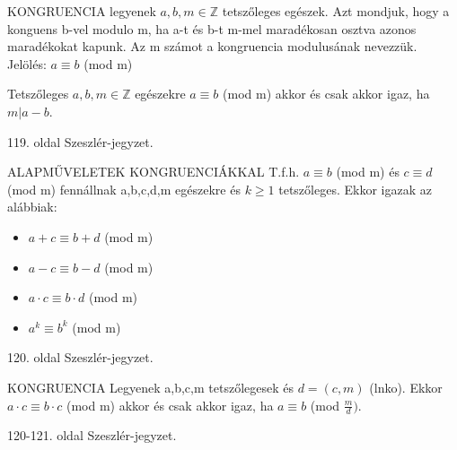 \begin{definicio}{KONGRUENCIA}
legyenek $a,b,m\in\mathbb{Z}$ tetszőleges egészek. Azt mondjuk, hogy a konguens b-vel modulo m, ha a-t és b-t m-mel maradékosan osztva azonos maradékokat kapunk. Az m számot a kongruencia modulusának nevezzük. \\
Jelölés: $a \equiv b$ (mod m)

\end{definicio}

\begin{tetel}{}
Tetszőleges $a,b,m\in\mathbb{Z}$ egészekre $a \equiv b$ (mod m) akkor és csak akkor igaz, ha $m|a-b$.
\end{tetel}

\begin{bizonyitas}{}
119. oldal Szeszlér-jegyzet.
\end{bizonyitas}

\begin{tetel}{ALAPMŰVELETEK KONGRUENCIÁKKAL}
T.f.h. $a \equiv b$ (mod m) és $c \equiv d$ (mod m) fennállnak a,b,c,d,m egészekre és $k \geq 1$ tetszőleges. Ekkor igazak az alábbiak:
\begin{itemize}
\item $a + c \equiv b + d$ (mod m)
\item $a - c \equiv b - d$ (mod m)
\item $a \cdot c \equiv b \cdot d$ (mod m)
\item $a^k \equiv b^k$ (mod m)
\end{itemize}
\end{tetel}

\begin{bizonyitas}{}
120. oldal Szeszlér-jegyzet.
\end{bizonyitas}

\begin{tetel}{KONGRUENCIA}
Legyenek a,b,c,m tetszőlegesek és $d = (c,m)$ (lnko). Ekkor $a\cdot c \equiv b\cdot c$ (mod m) akkor és csak akkor igaz, ha $a \equiv b$ (mod $\frac{m}{d})$.
\end{tetel}

\begin{bizonyitas}{}
120-121. oldal Szeszlér-jegyzet.
\end{bizonyitas}

